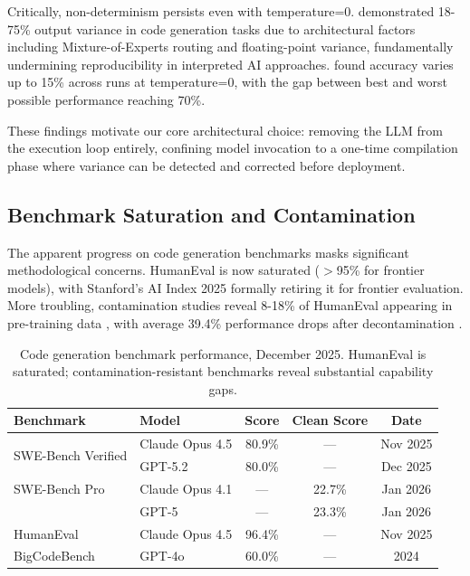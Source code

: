 \documentclass[11pt]{article}
\begin{document}
Critically, non-determinism persists even with temperature=0. \citet{ouyang2023nondeterminism} demonstrated 18-75\% output variance in code generation tasks due to architectural factors including Mixture-of-Experts routing and floating-point variance, fundamentally undermining reproducibility in interpreted AI approaches. \citet{atil2024nondeterminism} found accuracy varies up to 15\% across runs at temperature=0, with the gap between best and worst possible performance reaching 70\%.

These findings motivate our core architectural choice: removing the LLM from the execution loop entirely, confining model invocation to a one-time compilation phase where variance can be detected and corrected before deployment.

\subsection{Benchmark Saturation and Contamination}

The apparent progress on code generation benchmarks masks significant methodological concerns. HumanEval is now saturated ($>$95\% for frontier models), with Stanford's AI Index 2025 formally retiring it for frontier evaluation. More troubling, contamination studies reveal 8-18\% of HumanEval appearing in pre-training data \citep{yang2023rethinking}, with average 39.4\% performance drops after decontamination \citep{xu2024contamination}.

\begin{table}[ht]
\centering
\caption{Code generation benchmark performance, December 2025. HumanEval is saturated; contamination-resistant benchmarks reveal substantial capability gaps.}
\label{tab:benchmarks}
\begin{tabular}{llccc}
\toprule
Benchmark & Model & Score & Clean Score & Date \\
\midrule
\multirow{2}{*}{SWE-Bench Verified} & Claude Opus 4.5 & 80.9\% & --- & Nov 2025 \\
 & GPT-5.2 & 80.0\% & --- & Dec 2025 \\
\midrule
SWE-Bench Pro & Claude Opus 4.1 & --- & 22.7\% & Jan 2026 \\
 & GPT-5 & --- & 23.3\% & Jan 2026 \\
\midrule
HumanEval & Claude Opus 4.5 & 96.4\% & --- & Nov 2025 \\
\midrule
BigCodeBench & GPT-4o & 60.0\% & --- & 2024 \\
\bottomrule
\end{tabular}
\end{table}
\end{document}
